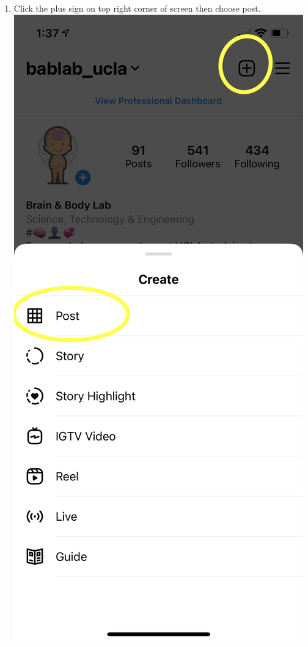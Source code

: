 \documentclass[]{book}
\begin{document}
\begin{enumerate}
\def\labelenumi{\arabic{enumi}.}
\item
  Click the plus sign on top right corner of screen then choose post.
  \includegraphics{images/lab_protocols/ig_ads/6.png}

\end{enumerate}
\end{document}
